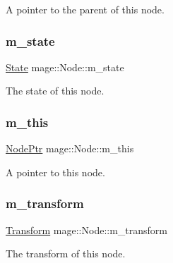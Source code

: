 A pointer to the parent of this node. \hypertarget{classmage_1_1_node_a76b775e32bb001c54a9927461eaf7926}{}\label{classmage_1_1_node_a76b775e32bb001c54a9927461eaf7926} 
\subsubsection{\texorpdfstring{m\+\_\+state}{m\_state}}
{\footnotesize\ttfamily \hyperlink{namespacemage_ae47d13d8477ee94893b9a3947d28eebc}{State} mage\+::\+Node\+::m\+\_\+state\hspace{0.3cm}{\ttfamily [private]}}

The state of this node. \hypertarget{classmage_1_1_node_ab056e1563dca22433efa152f4b6da46f}{}\label{classmage_1_1_node_ab056e1563dca22433efa152f4b6da46f} 
\subsubsection{\texorpdfstring{m\+\_\+this}{m\_this}}
{\footnotesize\ttfamily \hyperlink{classmage_1_1_node_ac575dc006e0ae1134277ade977dc06b6}{Node\+Ptr} mage\+::\+Node\+::m\+\_\+this\hspace{0.3cm}{\ttfamily [private]}}

A pointer to this node. \hypertarget{classmage_1_1_node_a0f4dd0c46d9713fd64b0e562862afac6}{}\label{classmage_1_1_node_a0f4dd0c46d9713fd64b0e562862afac6} 
\subsubsection{\texorpdfstring{m\+\_\+transform}{m\_transform}}
{\footnotesize\ttfamily \hyperlink{classmage_1_1_transform}{Transform} mage\+::\+Node\+::m\+\_\+transform\hspace{0.3cm}{\ttfamily [private]}}

The transform of this node. 